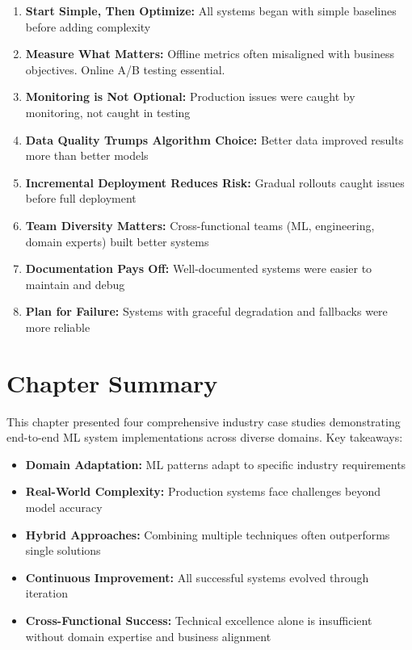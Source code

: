 \begin{enumerate}
    \item \textbf{Start Simple, Then Optimize:} All systems began with simple baselines before adding complexity

    \item \textbf{Measure What Matters:} Offline metrics often misaligned with business objectives. Online A/B testing essential.

    \item \textbf{Monitoring is Not Optional:} Production issues were caught by monitoring, not caught in testing

    \item \textbf{Data Quality Trumps Algorithm Choice:} Better data improved results more than better models

    \item \textbf{Incremental Deployment Reduces Risk:} Gradual rollouts caught issues before full deployment

    \item \textbf{Team Diversity Matters:} Cross-functional teams (ML, engineering, domain experts) built better systems

    \item \textbf{Documentation Pays Off:} Well-documented systems were easier to maintain and debug

    \item \textbf{Plan for Failure:} Systems with graceful degradation and fallbacks were more reliable
\end{enumerate}

\section{Chapter Summary}

This chapter presented four comprehensive industry case studies demonstrating end-to-end ML system implementations across diverse domains. Key takeaways:

\begin{itemize}
    \item \textbf{Domain Adaptation:} ML patterns adapt to specific industry requirements
    \item \textbf{Real-World Complexity:} Production systems face challenges beyond model accuracy
    \item \textbf{Hybrid Approaches:} Combining multiple techniques often outperforms single solutions
    \item \textbf{Continuous Improvement:} All successful systems evolved through iteration
    \item \textbf{Cross-Functional Success:} Technical excellence alone is insufficient without domain expertise and business alignment
\end{itemize}

